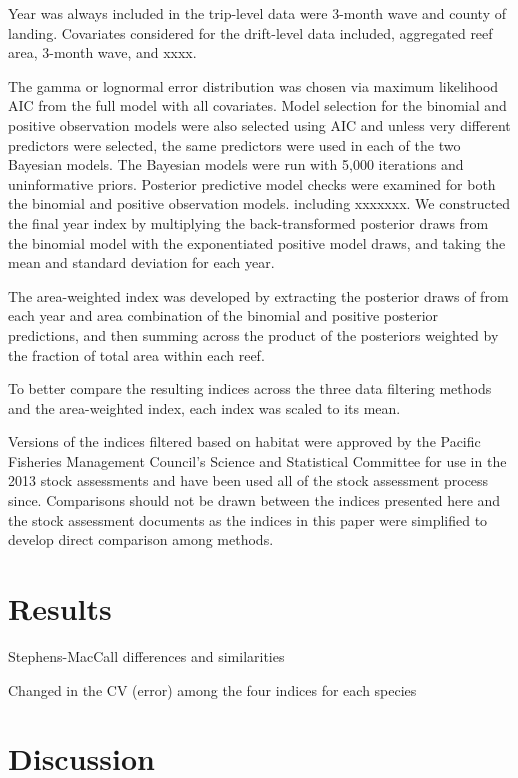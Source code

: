 \documentclass[
  authoryear,
  preprint,
  3p]{elsarticle}
\begin{document}
Year was always included in the trip-level data were 3-month wave and
county of landing. Covariates considered for the drift-level data
included, aggregated reef area, 3-month wave, and xxxx.

The gamma or lognormal error distribution was chosen via maximum
likelihood AIC from the full model with all covariates. Model selection
for the binomial and positive observation models were also selected
using AIC and unless very different predictors were selected, the same
predictors were used in each of the two Bayesian models. The Bayesian
models were run with 5,000 iterations and uninformative priors.
Posterior predictive model checks were examined for both the binomial
and positive observation models. including xxxxxxx. We constructed the
final year index by multiplying the back-transformed posterior draws
from the binomial model with the exponentiated positive model draws, and
taking the mean and standard deviation for each year.

The area-weighted index was developed by extracting the posterior draws
of from each year and area combination of the binomial and positive
posterior predictions, and then summing across the product of the
posteriors weighted by the fraction of total area within each reef.

To better compare the resulting indices across the three data filtering
methods and the area-weighted index, each index was scaled to its mean.

Versions of the indices filtered based on habitat were approved by the
Pacific Fisheries Management Council's Science and Statistical Committee
for use in the 2013 stock assessments and have been used all of the
stock assessment process since. Comparisons should not be drawn between
the indices presented here and the stock assessment documents as the
indices in this paper were simplified to develop direct comparison among
methods.

\hypertarget{results}{%
\section{Results}\label{results}}

Stephens-MacCall differences and similarities

Changed in the CV (error) among the four indices for each species

\FloatBarrier

\hypertarget{discussion}{%
\section{Discussion}\label{discussion}}
\end{document}
